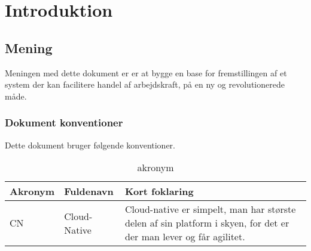 \chapter{Introduktion}

\section{Mening}

Meningen med dette dokument er er at bygge en base for fremstillingen af et system der kan facilitere handel af arbejdskraft, på en ny og revolutionerede måde.

\subsection{Dokument konventioner}

Dette dokument bruger følgende konventioner.

\begin{table}[H]
    \begin{small}
        \caption{akronym}
        \label{tab:acronym}
        \begin{center}
            \begin{tabular}{l|l|p{10cm}}
                \textbf{Akronym}     & \textbf{Fuldenavn}        & \textbf{Kort foklaring} \\
                \hline
                CN          & Cloud-Native      & Cloud-native er simpelt, man har største delen af sin platform i skyen, for det er der man lever og får agilitet.  \\
            \end{tabular}
        \end{center}
    \end{small}
\end{table}


